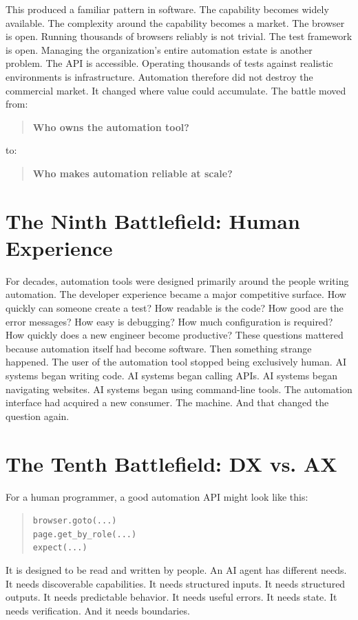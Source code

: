 \documentclass[11pt,twoside]{book}
\begin{document}
This produced a familiar pattern in software.
The capability becomes widely available.
The complexity around the capability becomes a market.
The browser is open.
Running thousands of browsers reliably is not trivial.
The test framework is open.
Managing the organization's entire automation estate is another problem.
The API is accessible.
Operating thousands of tests against realistic environments is infrastructure.
Automation therefore did not destroy the commercial market.
It changed where value could accumulate.
The battle moved from:
\begin{quote}
\textbf{Who owns the automation tool?}
\end{quote}
to:
\begin{quote}
\textbf{Who makes automation reliable at scale?}
\end{quote}

\section*{The Ninth Battlefield: Human Experience}

For decades, automation tools were designed primarily around the people writing automation.
The developer experience became a major competitive surface.
How quickly can someone create a test?
How readable is the code?
How good are the error messages?
How easy is debugging?
How much configuration is required?
How quickly does a new engineer become productive?
These questions mattered because automation itself had become software.
Then something strange happened.
The user of the automation tool stopped being exclusively human.
AI systems began writing code.
AI systems began calling APIs.
AI systems began navigating websites.
AI systems began using command-line tools.
The automation interface had acquired a new consumer.
The machine.
And that changed the question again.

\section*{The Tenth Battlefield: DX vs. AX}

For a human programmer, a good automation API might look like this:
\begin{quote}
\texttt{browser.goto(...)}\\
\texttt{page.get\_by\_role(...)}\\
\texttt{expect(...)}
\end{quote}
It is designed to be read and written by people.
An AI agent has different needs.
It needs discoverable capabilities.
It needs structured inputs.
It needs structured outputs.
It needs predictable behavior.
It needs useful errors.
It needs state.
It needs verification.
And it needs boundaries.
\end{document}
